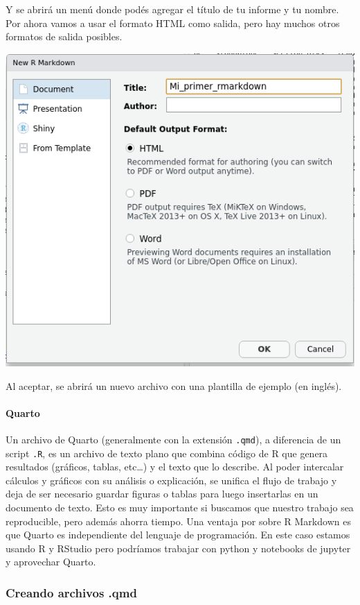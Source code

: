 \documentclass[
  letterpaper,
  DIV=11,
  numbers=noendperiod]{scrartcl}
\let\oldparagraph\paragraph
\renewcommand{\paragraph}[1]{\oldparagraph{#1}\mbox{}}
\begin{document}
Y se abrirá un menú donde podés agregar el título de tu informe y tu
nombre. Por ahora vamos a usar el formato HTML como salida, pero hay
muchos otros formatos de salida posibles.

\includegraphics{img/nuevo-rmd.png}

Al aceptar, se abrirá un nuevo archivo con una plantilla de ejemplo (en
inglés).

\hypertarget{quarto}{%
\paragraph{Quarto}\label{quarto}}

Un archivo de Quarto (generalmente con la extensión \texttt{.qmd}), a
diferencia de un script \texttt{.R}, es un archivo de texto plano que
combina código de R que genera resultados (gráficos, tablas, etc\ldots)
y el texto que lo describe. Al poder intercalar cálculos y gráficos con
su análisis o explicación, se unifica el flujo de trabajo y deja de ser
necesario guardar figuras o tablas para luego insertarlas en un
documento de texto. Esto es muy importante si buscamos que nuestro
trabajo sea reproducible, pero además ahorra tiempo. Una ventaja por
sobre R Markdown es que Quarto es independiente del lenguaje de
programación. En este caso estamos usando R y RStudio pero podríamos
trabajar con python y notebooks de jupyter y aprovechar Quarto.

\hypertarget{creando-archivos-.qmd}{%
\subsubsection{Creando archivos .qmd}\label{creando-archivos-.qmd}}
\end{document}
